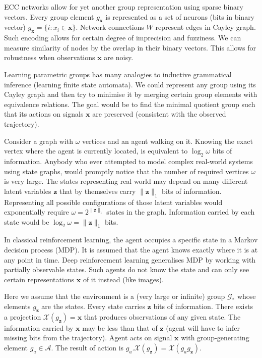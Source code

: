 \documentclass[12pt]{article}
\begin{document}
ECC networks allow for yet another group representation using sparse binary vectors. 
Every group element $g_{\boldsymbol{x}}$ is represented as a set of neurons (bits in binary vector) $g_{\boldsymbol{x}}=\{i:x_i\in\boldsymbol{x}\}$. Network connections  $W$ represent edges in Cayley graph. Such encoding allows for certain degree of imprecision and fuzziness. We can measure similarity of nodes by the overlap in their binary vectors. This allows for robustness when observations $\boldsymbol{x}$ are noisy.


Learning parametric groups has many analogies to inductive grammatical inference (learning finite state automata). We could represent any group using its Cayley graph and then try to minimise it by merging certain group elements with equivalence relations. The goal would be to find the minimal quotient group such that its actions on signals $\boldsymbol{x}$ are preserved (consistent with the observed trajectory). 

Consider a graph with $\omega$ vertices and an agent walking on it. Knowing the exact vertex where the agent is currently located, is equivalent to $\log_2 \omega$ bits of information. Anybody who ever attempted to model complex real-world systems using state graphs, would promptly notice that the number of required vertices $\omega$ is very large. The states representing real world may depend on many different latent variables $\boldsymbol{z}$ that by themselves carry $\lVert \boldsymbol{z} \rVert_1$ bits of information. Representing all possible configurations of those latent variables would exponentially require $\omega=2^{\lVert \boldsymbol{z} \rVert_1}$ states in the graph. Information carried by each state would be $\log_2 \omega=\lVert \boldsymbol{z} \rVert_1$ bits.


In classical reinforcement learning, the agent occupies a specific state in a Markov decision process (MDP). It is assumed that the agent knows exactly where it is at any point in time. Deep reinforcement learning generalises MDP by working with partially observable states. Such agents do not know the state and can only see certain representations $\boldsymbol{x}$ of it instead (like images).

Here we assume that the environment is a (very large or infinite) group $\mathcal{G}_*$ whose elements $g_{\boldsymbol{z}}$ are the states. Every state carries $\boldsymbol{z}$ bits of information. There exists a projection  $\mathcal{X}(g_{\boldsymbol{z}})=\boldsymbol{x}$ that produces observations of any given state. The information carried by $\boldsymbol{x}$ may be less than that of $\boldsymbol{z}$ (agent will have to infer missing bits from the trajectory). Agent acts on signal $\boldsymbol{x}$ with group-generating element $g_a\in \mathcal{A}$. The result of action is $g_a.\mathcal{X}(g_{\boldsymbol{z}})=\mathcal{X}(g_ag_{\boldsymbol{z}})$. 
\end{document}
